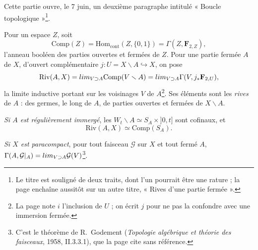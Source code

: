 \documentclass[11pt,a4paper]{article}
\begin{document}
Cette partie ouvre, le 7 juin, un deuxième paragraphe intitulé « Boucle
topologique »\footnote{Le titre est souligné de deux traits, dont l'un pourrait
être une rature ; la page enchaîne aussitôt sur un autre titre, « Rives d'une
partie fermée ».}.

Pour un espace $Z$, soit
\[
\mathrm{Comp}(Z) = \mathrm{Hom}_{\mathrm{cont}}(Z, \{0,1\}) = \Gamma(Z,
\mathbf{F}_{2,Z}),
\]
l'anneau booléen des parties ouvertes et fermées de $Z$. Pour une partie fermée $A$
de $X$, d'ouvert complémentaire $j : U = X \smallsetminus A \hookrightarrow X$, on
pose
\[
\mathrm{Riv}(A,X) = \varinjlim_{V \supset A} \mathrm{Comp}(V \smallsetminus A) =
\varinjlim_{V \supset A} \Gamma(V, j_{*}\mathbf{F}_{2,U}),
\]
la limite inductive portant sur les voisinages $V$ de $A$\footnote{La page note
$i$ l'inclusion de $U$ ; on écrit $j$ pour ne pas la confondre avec une
immersion fermée.}. Ses éléments sont les \emph{rives} de $A$ : des germes, le
long de $A$, de parties ouvertes et fermées de $X \smallsetminus A$.

\emph{Si $A$ est régulièrement immergé}, les $W_{t} \smallsetminus A \simeq
S_{A} \times {]0,t]}$ sont cofinaux, et
\[
\mathrm{Riv}(A,X) \simeq \mathrm{Comp}(S_{A}).
\]

\emph{Si $X$ est paracompact}, pour tout faisceau $\mathcal{G}$ sur $X$ et tout
fermé $A$, $\Gamma(A, \mathcal{G}|_{A}) = \varinjlim_{V \supset A}
\mathcal{G}(V)$\footnote{C'est le théorème de R.~Godement (\emph{Topologie
algébrique et théorie des faisceaux}, 1958, II.3.3.1), que la page cite sans
référence.}.
\end{document}
